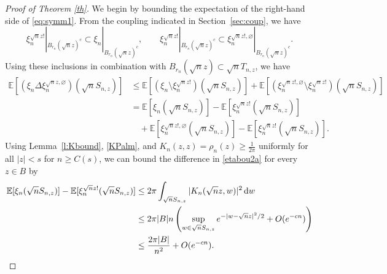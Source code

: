 \documentclass{amsart}
\theoremstyle{plain}
\theoremstyle{definition}
\theoremstyle{remark}
\def\E{\mathbb E}
\def\d{\mathrm d}
\begin{document}
\begin{proof}[Proof of Theorem \ref{th}]
We begin by bounding the expectation of the right-hand side of \eqref{eq:symm1}. From the coupling indicated in Section~\ref{sec:coup}, we have 
\[ \xi_n^{\sqrt n z!}  |_{B_{r_n}(\sqrt n z)^c}  \subset \xi_n |_{B_{r_n}(\sqrt n z)^c}, \qquad \xi_n^{\sqrt n z!} |_{B_{r_n}(\sqrt n z)^c}\subset  \xi_n^{\sqrt{n} z!,\varnothing} |_{B_{r_n}(\sqrt n z)^c}. \]  Using these inclusions in combination with  $B_{r_n}(\sqrt n z) \subset \sqrt nT_{n,z}$, we have 
\begin{align}
	\E [(\xi_n \Delta  \xi_n^{\sqrt n z,\varnothing}) (\sqrt nS_{n,z})]&\le \E[(\xi_n \setminus \xi_n^{\sqrt n z!})(\sqrt nS_{n,z})] +\E[( \xi_n^{\sqrt{n} z!,\varnothing} \setminus \xi_n^{\sqrt n z!})(\sqrt nS_{n,z})] \nonumber\\
	&=\E [\xi_n (\sqrt nS_{n,z})]- \E[ \xi_n^{\sqrt n z!}(\sqrt n S_{n,z})] \label{etabou2a}\\
	&\quad +\E[ \xi_n^{\sqrt n z!,\varnothing }(\sqrt nS_{n,z})]-\E[\xi_n^{\sqrt n z!}(\sqrt nS_{n,z})].\label{etabou2b}
\end{align}
Using Lemma~\ref{l:Kbound}, \eqref{KPalm}, and  $K_n(z,z)=\rho_n(z)\ge \frac 1{2\pi}$ uniformly for all $|z| < s$  for $n \ge C(s)$, we can bound the difference in \eqref{etabou2a} for every $z \in B$ by
\begin{align}
\E [\xi_n (\sqrt nS_{n,z})]- \E[ \xi_n^{\sqrt n z!}(\sqrt n S_{n,z})] & \le 2 \pi \int_{\sqrt nS_{n,z}} |K_n(\sqrt nz,w)|^2\,  \d w \notag  \\ &\le 2 \pi |B| n \left(  \sup_{w \in \sqrt nS_{n,z}} e^{-|w-\sqrt n z|^2/2}+O(e^{-cn}) \right)\nonumber\\
&\le \frac{2 \pi |B|}{{n^2}}+O(e^{-cn}).
\label{MRdens}
\end{align}


\end{proof}
\end{document}
